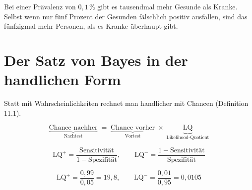 \begin{warnung}
\begin{center}
\begin{minipage}{0.9\textwidth}
Bei einer Prävalenz von $0{,}1\,\%$ gibt es tausendmal mehr Gesunde als Kranke. Selbst wenn nur fünf Prozent der Gesunden fälschlich positiv ausfallen, sind das fünfzigmal mehr Personen, als es Kranke überhaupt gibt.
\end{minipage}
\end{center}

\begin{center}
\end{center}

\begin{center}
\begin{minipage}{0.88\textwidth}
\end{minipage}
\end{center}
\end{warnung}

\section{Der Satz von Bayes in der handlichen Form}

\begin{merksatz}
Statt mit Wahrscheinlichkeiten rechnet man handlicher mit Chancen (Definition 11.1).

\begin{center}
\begin{minipage}{0.9\textwidth}
\[ \underbrace{\text{Chance nachher}}_{\text{Nachtest}} \;=\; \underbrace{\text{Chance vorher}}_{\text{Vortest}} \;\times\; \underbrace{\mathrm{LQ}}_{\text{Likelihood-Quotient}} \]
\end{minipage}
\end{center}

\[ \mathrm{LQ}^{+} = \frac{\text{Sensitivität}}{1-\text{Spezifität}}, \qquad \mathrm{LQ}^{-} = \frac{1-\text{Sensitivität}}{\text{Spezifität}} \]

\[ \mathrm{LQ}^{+} = \frac{0{,}99}{0{,}05} = 19{,}8, \qquad \mathrm{LQ}^{-} = \frac{0{,}01}{0{,}95} = 0{,}0105 \]
\end{merksatz}

